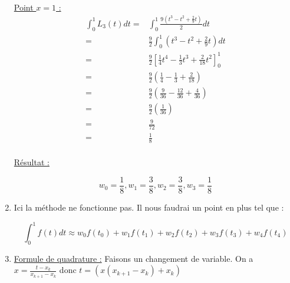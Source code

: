 \documentclass{article}
\begin{document}
\begin{enumerate}
\underline{Point $x = 1$ :}
\begin{equation*}
  \begin{split}
    \int_0^1 {L_3(t) dt} = & \int_0^1 {\frac{ 9 (t^3 - t^2 + \frac{2}{9} t)}
    {2} dt}
    \\
    = & \frac{9}{2} \int_0^1 { \left(t^3 - t^2 + \frac{2}{9} t \right) dt}
    \\
    = & \frac{9}{2} \left[ \frac{1}{4}t^4 - \frac{1}{3}t^3 +
      \frac{2}{18} t^2 \right]_0^1
    \\
    = & \frac{9}{2} \left(\frac{1}{4} - \frac{1}{3} +
      \frac{2}{18} \right)
    \\
    = & \frac{9}{2} \left( \frac{9}{36} - \frac{12}{36} +
      \frac{4}{36} \right)
    \\
    = & \frac{9}{2} \left( \frac{1}{36} \right)
    \\
    = & \frac{9}{72}
    \\
    = & \frac{1}{8}
    \\
  \end{split}
\end{equation*}

\underline{Résultat :}

\begin{equation*}
    w_0 = \frac{1}{8},
    w_1 = \frac{3}{8},
    w_2 = \frac{3}{8},
    w_3 = \frac{1}{8}
\end{equation*}

\item Ici la méthode ne fonctionne pas. \newline
  Il nous faudrai un point en plus tel que :

  \begin{equation*}
    \int_0^1 {f(t) dt} \approx w_0 f(t_0) + w_1 f(t_1) + w_2 f(t_2) +
    w_3 f(t_3) + w_4 f(t_4)
  \end{equation*}
  
\item \underline{Formule de quadrature :}
  Faisons un changement de variable. \newline
  On a $x = \frac{t - x_k}{x_{k + 1} - x_k}$ donc $t = (x (x_{k + 1} -
  x_k) + x_k )$
  

\end{enumerate}
\end{document}
